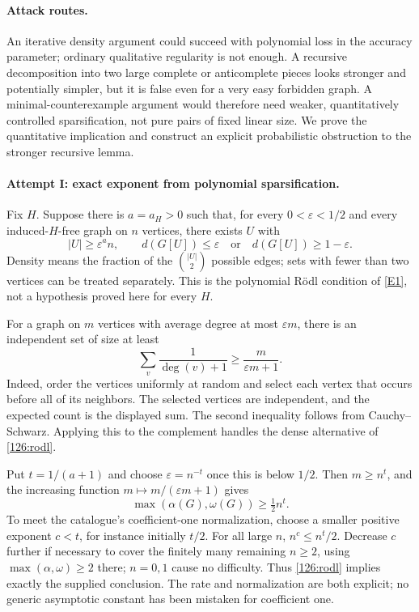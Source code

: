 \documentclass[11pt,a4paper]{article}
\newcommand{\eref}[2]{\hyperlink{extra:#1:#2}{[E#2]}}
\numberwithin{equation}{section}
\begin{document}
\paragraph{Attack routes.}
An iterative density argument could succeed with polynomial loss in the
accuracy parameter; ordinary qualitative regularity is not enough.
A recursive decomposition into two large complete or anticomplete
pieces looks stronger and potentially simpler, but it is false even
for a very easy forbidden graph.  A minimal-counterexample argument
would therefore need weaker, quantitatively controlled sparsification,
not pure pairs of fixed linear size.  We prove the quantitative
implication and construct an explicit probabilistic obstruction to the
stronger recursive lemma.

\paragraph{Attempt I: exact exponent from polynomial sparsification.}
Fix $H$.  Suppose there is $a=a_H>0$ such that, for every
$0<\varepsilon<1/2$ and every induced-$H$-free graph on $n$ vertices,
there exists $U$ with
\begin{equation}\label{126:rodl}
 |U|\geq\varepsilon^a n,\qquad
 d(G[U])\leq\varepsilon\quad\text{or}\quad
 d(G[U])\geq1-\varepsilon.
\end{equation}
Density means the fraction of the $\binom{|U|}{2}$ possible edges;
sets with fewer than two vertices can be treated separately.
This is the polynomial R\"odl condition of \eref{126}{1}, not a
hypothesis proved here for every $H$.

For a graph on $m$ vertices with average degree at most $\varepsilon m$,
there is an independent set of size at least
\begin{equation}\label{126:caro}
 \sum_{v}\frac1{\deg(v)+1}\geq\frac{m}{\varepsilon m+1}.
\end{equation}
Indeed, order the vertices uniformly at random and select each vertex
that occurs before all of its neighbors.  The selected vertices are
independent, and the expected count is the displayed sum.  The second
inequality follows from Cauchy--Schwarz.  Applying this to the complement
handles the dense alternative of \eqref{126:rodl}.

Put $t=1/(a+1)$ and choose $\varepsilon=n^{-t}$ once this is below
$1/2$.  Then $m\geq n^t$, and the increasing function
$m\mapsto m/(\varepsilon m+1)$ gives
\[
 \max(\alpha(G),\omega(G))\geq\tfrac12n^t.
\]
To meet the catalogue's coefficient-one normalization, choose a smaller
positive exponent $c<t$, for instance initially $t/2$.  For all large
$n$, $n^c\leq n^t/2$.  Decrease $c$ further if necessary to cover the
finitely many remaining $n\geq2$, using
$\max(\alpha,\omega)\geq2$ there; $n=0,1$ cause no difficulty.
Thus \eqref{126:rodl} implies exactly the supplied conclusion.
The rate and normalization are both explicit; no generic asymptotic
constant has been mistaken for coefficient one.
\end{document}

